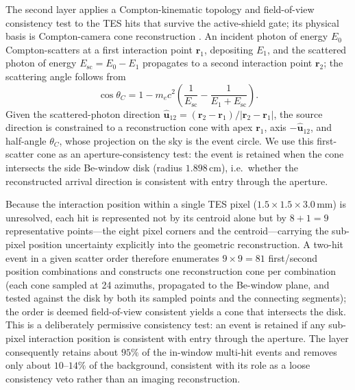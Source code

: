 \documentclass[11pt]{article}
\begin{document}
The second layer applies a Compton-kinematic topology and field-of-view
consistency test to the TES hits that survive the active-shield gate; its
physical basis is Compton-camera cone reconstruction \cite{Zoglauer2006}. An
incident photon of energy $E_0$ Compton-scatters at a first interaction point
$\mathbf r_1$, depositing $E_1$, and the scattered photon of energy
$E_{\mathrm{sc}}=E_0-E_1$ propagates to a second interaction point $\mathbf r_2$;
the scattering angle follows from
\begin{equation}
  \cos\theta_C =
  1 - m_ec^2\left(\frac{1}{E_{\mathrm{sc}}}
  - \frac{1}{E_1+E_{\mathrm{sc}}}\right).
\end{equation}
Given the scattered-photon direction
$\hat{\mathbf u}_{12}=(\mathbf r_2-\mathbf r_1)/|\mathbf r_2-\mathbf r_1|$, the
source direction is constrained to a reconstruction cone with apex $\mathbf r_1$,
axis $-\hat{\mathbf u}_{12}$, and half-angle $\theta_C$, whose projection on the
sky is the event circle. We use this first-scatter cone as an aperture-consistency
test: the event is retained when the cone intersects the side Be-window disk (radius
$1.898\,\mathrm{cm}$), i.e.\ whether the reconstructed arrival direction is
consistent with entry through the aperture.

Because the interaction position within a single TES pixel
($1.5\times1.5\times3.0\,\mathrm{mm}$) is unresolved, each hit is represented not
by its centroid alone but by $8+1=9$ representative points---the eight pixel
corners and the centroid---carrying the sub-pixel position uncertainty
explicitly into the geometric reconstruction. A two-hit event in a given scatter
order therefore enumerates $9\times9=81$ first/second position combinations and
constructs one reconstruction cone per combination (each cone sampled at 24
azimuths, propagated to the Be-window plane, and tested against the disk by both
its sampled points and the connecting segments); the order is deemed
field-of-view consistent  yields a cone that
intersects the disk. This is a deliberately permissive consistency test: an
event is retained if any sub-pixel interaction position is consistent with entry
through the aperture. The layer consequently retains about $95\%$ of the
in-window multi-hit events and removes only about $10$--$14\%$ of the background,
consistent with its role as a loose consistency veto rather than an imaging
reconstruction.
\end{document}
